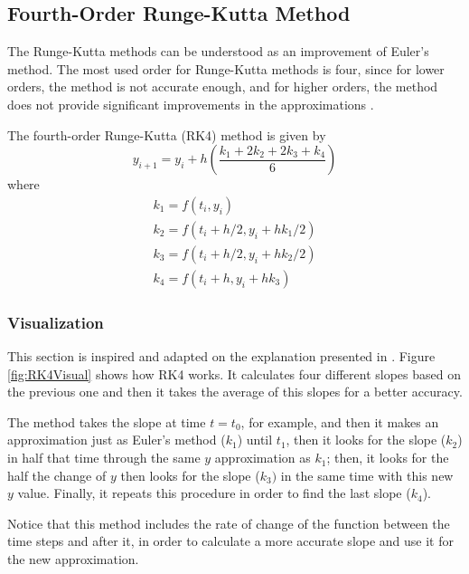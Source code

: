 \subsection{Fourth-Order Runge-Kutta Method}\label{sec:rk4}
The Runge-Kutta methods can be understood as an improvement of Euler's method. The most used order for Runge-Kutta methods is four, since for lower orders, the method is not accurate enough, and for higher orders, the method does not provide significant improvements in the approximations \cite{mathews2004numerical}.

The fourth-order Runge-Kutta (RK4) method is given by
\begin{equation}
    y _ { i + 1 } = y _ { i } + h\left(\dfrac{k_1+2k_2+2k_3+k_4}{6}\right)
\end{equation}
where 
\begin{equation*}
    \begin{array} { l } { k _ { 1 } = f \left( t _ { i } , y _ { i } \right) } \\
    { k _ { 2 } = f \left( t _ { i } + h / 2 , y _ { i } + h k _ { 1 } / 2 \right) } \\
    { k _ { 3 } = f \left( t _ { i } + h / 2 , y _ { i } + h k _ { 2 } / 2 \right) } \\ 
    { k _ { 4 } = f \left( t _ { i } + h , y _ { i } + h k _ { 3 } \right) } \end{array}
\end{equation*}

\subsubsection{Visualization}
This section is inspired and adapted on the explanation presented in \cite{vis_rk4}. Figure \ref{fig:RK4Visual} shows how RK4 works. It calculates four different slopes based on the previous one and then it takes the average of this slopes for a better accuracy. 

The method takes the slope at time $t=t_0$, for example, and then it makes an approximation just as Euler's method ($k_1$) until $t_1$, then it looks for the slope ($k_2$) in half that time through the same $y$ approximation as $k_1$; then, it looks for the half the change of $y$ then looks for the slope ($k_3)$ in the same time with this new $y$ value. Finally, it repeats this procedure in order to find the last slope ($k_4$).

Notice that this method includes the rate of change of the function between the time steps and after it, in order to calculate a more accurate slope and use it for the new approximation.

